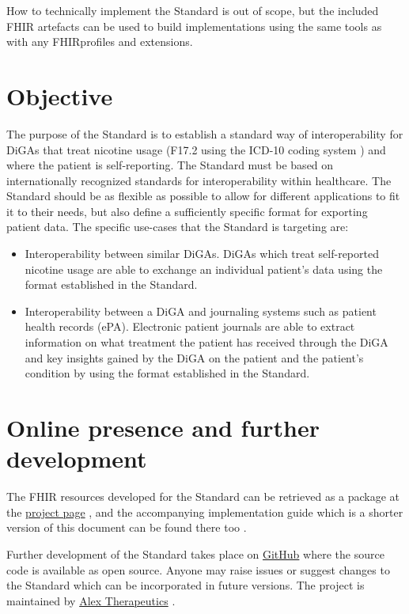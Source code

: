 \documentclass{report}
\newcommand{\fhir}{FHIR\textsuperscript{\textregistered}}
\begin{document}
How to technically implement the Standard is out of scope, but the included FHIR artefacts can be used to build implementations using the same tools as with any \fhir profiles and extensions. 


\section{Objective}
The purpose of the Standard is to establish a standard way of interoperability for DiGAs that treat nicotine usage (F17.2 using the ICD-10 coding system \cite{dimdi}) and where the patient is self-reporting. The Standard must be based on internationally recognized
standards for interoperability within healthcare. The Standard should be as flexible as possible to allow for different applications to fit it to their needs, but also define a sufficiently specific format for exporting patient data. The specific use-cases that the Standard is targeting are:

\begin{itemize}
    \item Interoperability between similar DiGAs. DiGAs which treat self-reported nicotine usage are able to exchange an individual patient's data using the format established in the Standard.
    \item Interoperability between a DiGA and journaling systems such as patient health records (ePA). Electronic patient journals are able to extract information on what treatment the patient has received through the DiGA and key insights gained by the DiGA on the patient and the patient's condition by using the format established in the Standard.
\end{itemize}

\section{Online presence and further development}
The FHIR resources developed for the Standard can be retrieved as a package at the \href{https://simplifier.net/treat-nicotine-usage-diga}{project page} \cite{project}, 
and the accompanying implementation guide which is a shorter version of this document can be found there too \cite{ig}.

Further development of the Standard takes place on \href{https://github.com/alex-therapeutics/diga-nicotine-usage-fhir}{GitHub} \cite{github} where the source code is available as open source.
Anyone may raise issues or suggest changes to the Standard which can be incorporated in future versions. The project is maintained by \href{https://www.alextherapeutics.com}{Alex Therapeutics} \cite{alex}.
\end{document}
